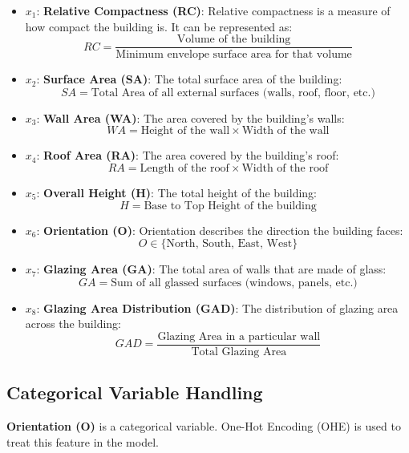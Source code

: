 \documentclass{article}
\begin{document}
\begin{itemize}
    \item \( x_1 \): \textbf{Relative Compactness (RC)}: Relative compactness is a measure of how compact the building is. It can be represented as:
    \[
    RC = \frac{\text{Volume of the building}}{\text{Minimum envelope surface area for that volume}}
    \]

    \item \( x_2 \): \textbf{Surface Area (SA)}: The total surface area of the building:
    \[
    SA = \text{Total Area of all external surfaces (walls, roof, floor, etc.)}
    \]

    \item \( x_3 \): \textbf{Wall Area (WA)}: The area covered by the building's walls:
    \[
    WA = \text{Height of the wall} \times \text{Width of the wall}
    \]

    \item \( x_4 \): \textbf{Roof Area (RA)}: The area covered by the building's roof:
    \[
    RA = \text{Length of the roof} \times \text{Width of the roof}
    \]

    \item \( x_5 \): \textbf{Overall Height (H)}: The total height of the building:
    \[
    H = \text{Base to Top Height of the building}
    \]

    \item \( x_6 \): \textbf{Orientation (O)}: Orientation describes the direction the building faces:
    \[
    O \in \{\text{North, South, East, West}\}
    \]

    \item \( x_7 \): \textbf{Glazing Area (GA)}: The total area of walls that are made of glass:
    \[
    GA = \text{Sum of all glassed surfaces (windows, panels, etc.)}
    \]

    \item \( x_8 \): \textbf{Glazing Area Distribution (GAD)}: The distribution of glazing area across the building:
    \[
    GAD = \frac{\text{Glazing Area in a particular wall}}{\text{Total Glazing Area}}
    \]
\end{itemize}

\subsection{Categorical Variable Handling}
\textbf{Orientation (O)} is a categorical variable. One-Hot Encoding (OHE) is used to treat this feature in the model.
\end{document}
